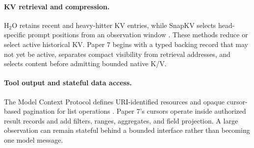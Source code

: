 \documentclass[11pt]{article}
\begin{document}
\paragraph{KV retrieval and compression.}
H$_2$O retains recent and heavy-hitter KV entries, while SnapKV selects
head-specific prompt positions from an observation window
\cite{zhang2023h2o,li2024snapkv}. These methods reduce or select active
historical KV. Paper 7 begins with a typed backing record that may not yet be
active, separates compact visibility from retrieval addresses, and selects
content before admitting bounded native K/V.

\paragraph{Tool output and stateful data access.}
The Model Context Protocol defines URI-identified resources and opaque
cursor-based pagination for list operations \cite{mcp2025resources}. Paper 7's
cursors operate inside authorized result records and add filters, ranges,
aggregates, and field projection. A large observation can remain stateful
behind a bounded interface rather than becoming one model message.

\begin{table}[H]
\centering
{}
\caption{Mechanism-level comparison at the granularity supported by primary
papers or official documentation.}
\label{tab:related}
\end{table}
\end{document}
